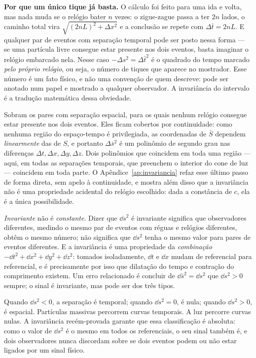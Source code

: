 \documentclass[12pt,a4paper,oneside]{book}
\theoremstyle{rgplain}
\theoremstyle{rgremark}
\begin{document}
\textbf{Por que um único tique já basta.} O cálculo foi feito para uma ida e
volta, mas nada muda se o relógio bater $n$ vezes: o zigue-zague passa a ter
$2n$ lados, o caminho total vira $\sqrt{(2nL)^2+\Delta x^2}$ e a conclusão se
repete com $\Delta \bar t=2nL$. E qualquer par de eventos com separação temporal
pode ser posto nessa forma --- se uma partícula livre consegue estar presente
nos dois eventos, basta imaginar o relógio embarcado nela. Nesse caso
$-\Delta s^2=\Delta \bar t^2$ é o quadrado do tempo marcado \emph{pelo próprio
relógio}, ou seja, o número de tiques que aparece no mostrador. Esse número é
um fato físico, e não uma convenção de quem descreve: pode ser anotado num
papel e mostrado a qualquer observador. A invariância do intervalo é a
tradução matemática dessa obviedade.

Sobram os pares com separação espacial, para os quais nenhum relógio consegue
estar presente nos dois eventos. Eles ficam cobertos por continuidade: como
nenhuma região do espaço-tempo é privilegiada, as coordenadas de $\bar S$ dependem
\emph{linearmente} das de $S$, e portanto $\Delta \bar s^2$ é um polinômio de
segundo grau nas diferenças $\Delta t,\Delta x,\Delta y,\Delta z$. Dois
polinômios que coincidem em toda uma região --- aqui, em todas as separações
temporais, que preenchem o interior do cone de luz --- coincidem em toda
parte. O Apêndice~\ref{ap:invariancia} refaz esse último passo de forma
direta, sem apelo à continuidade, e mostra além disso que a invariância não é
uma propriedade acidental do relógio escolhido: dada a constância de $c$, ela
é a única possibilidade.

\begin{atencao}
\emph{Invariante} não é \emph{constante}. Dizer que $\dd s^2$ é invariante
significa que observadores diferentes, medindo o mesmo par de eventos com
réguas e relógios diferentes, obtêm o mesmo número; não significa que $\dd
s^2$ tenha o mesmo valor para pares de eventos diferentes. E a invariância é
uma propriedade da \emph{combinação} $-\dd t^2+\dd x^2+\dd y^2+\dd z^2$:
tomados isoladamente, $\dd t$ e $\dd x$ mudam de referencial para referencial,
e é precisamente por isso que dilatação do tempo e contração do comprimento
existem. Um erro relacionado é concluir de $\dd \bar s^2=\dd s^2$ que $\dd s^2>0$
sempre; o sinal é invariante, mas pode ser dos três tipos.
\end{atencao}

Quando $\dd s^2<0$, a separação é temporal; quando $\dd s^2=0$, é nula; quando
$\dd s^2>0$, é espacial. Partículas massivas percorrem curvas temporais. A luz
percorre curvas nulas. A invariância recém-provada garante que essa
classificação é absoluta: como o valor de $\dd s^2$ é o mesmo em todos os
referenciais, o seu sinal também é, e dois observadores nunca discordam sobre
se dois eventos podem ou não estar ligados por um sinal físico.
\end{document}
